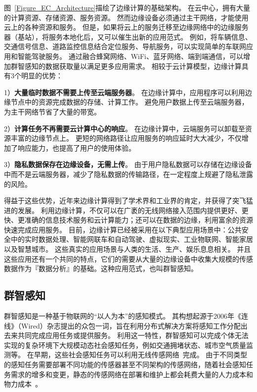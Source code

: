 图~\ref{Figure_EC_Architecture}描绘了边缘计算的基础架构。
在云中心，拥有大量的计算资源、存储资源、服务资源。
然而边缘设备必须通过主干网络，才能使用云上的各种资源和服务。
但是，如果将云上的服务迁移至边缘网络中的边缘服务器（基站），将服务本地化后，又可以催生出新的应用范式。
例如，将车辆信息、交通信号信息、道路监控信息结合定位服务、导航服务，可以实现简单的车联网应用和智能驾驶服务。
通过融合蜂窝网络、WiFi、蓝牙网络、端到端通信，可以增加群智感知的数据获取量以满足更多应用需求。
相较于云计算模型，边缘计算具有3个明显的优势：

1）\textbf{大量临时数据不需要上传至云端服务器}。
在边缘计算中，应用程序可以利用边缘节点中的资源完成数据的存储、计算工作。
避免用户数据上传至云端服务器，为主干网络节省了大量的带宽。

2）\textbf{计算任务不再需要云计算中心的响应}。
在边缘计算中，云端服务可以卸载至资源丰富的边缘节点上。
更短的网络路径让应用服务的响应延时大大减少，不仅增加了响应能力，也提高了用户的使用体验。

3）\textbf{隐私数据保存在边缘设备，无需上传}。
由于用户隐私数据可以存储在边缘设备中而不是云端服务器，减少了隐私数据的传输路径，在一定程度上规避了隐私泄露的风险。

得益于这些优势，近年来边缘计算得到了学术界和工业界的肯定，并获得了突飞猛进的发展。
利用边缘计算，不仅可以在广袤的无线网络接入范围内提供更好、更快、更准确的信息技术服务和云计算能力；还可以在数据的边缘，利用富余的资源快速完成应用服务。
目前，边缘计算已经被采用在以下典型应用场景中：公共安全中的实时数据处理、智能网联车和自动驾驶、虚拟现实、工业物联网、智能家居以及智慧城市。
这些真实的应用场景与人类的生活、生产、娱乐息息相关。
并且这些应用还有一个共同的特点，它们的需要从大量的边缘设备中收集大规模的传感数据作为『数据分析』的基础。这种应用范式，也叫群智感知。

\subsection{群智感知}


群智感知是一种基于物联网的“以人为本”的感知模式。
其构想起源于2006年《连线》（Wired）杂志提出的众包一词，旨在利用分布式解决方案将感知工作分配出去来共同完成应用任务或提供服务。
利用这一特性，群智感知可以完成个体无法实现的复杂环境下大规模动态社会感知任务，例如交通拥堵状态、城市空气质量监测等。
在早期，这些社会感知任务可以利用无线传感网络~\cite{DBLP:journals/cn/AkyildizSSC02}完成。
由于不同类型的感知任务需要部署不同功能的传感器甚至不同架构的传感网络，随着社会感知任务需求的增多和变更，静态的传感网络在部署和维护上都会耗费大量的人力成本和物力成本~\cite{CNKI/2006/WSNRen}。

